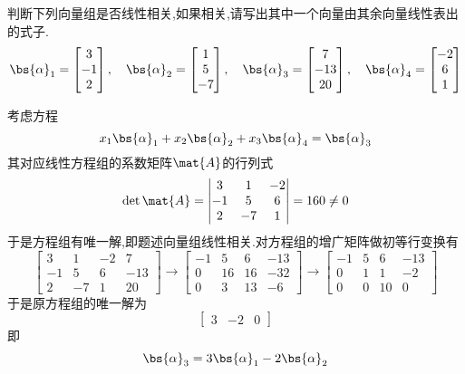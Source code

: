 \documentclass{ctexart}
\begin{document}
\begin{homework}[2(3)]
    判断下列向量组是否线性相关,如果相关,请写出其中一个向量由其余向量线性表出的式子.
    \[\bs{\alpha}_1=\begin{bmatrix}
        3\\-1\\2
    \end{bmatrix},\quad\bs{\alpha}_2=\begin{bmatrix}
        1\\5\\-7
    \end{bmatrix},\quad\bs{\alpha}_3=\begin{bmatrix}
        7\\-13\\20
    \end{bmatrix},\quad\bs{\alpha}_4=\begin{bmatrix}
        -2\\6\\1
    \end{bmatrix}\]
\end{homework}
\begin{solution}
    考虑方程
    \[x_1\bs{\alpha}_1+x_2\bs{\alpha}_2+x_3\bs{\alpha}_4=\bs{\alpha}_3\]
    其对应线性方程组的系数矩阵$\mat{A}$的行列式
    \[\det\mat{A}=\begin{vmatrix}
        3&1&-2\\
        -1&5&6\\
        2&-7&1
    \end{vmatrix}=160\neq0\]
    于是方程组有唯一解,即题述向量组线性相关.对方程组的增广矩阵做初等行变换有
    \[\begin{bmatrix}
        3&1&-2&7\\
        -1&5&6&-13\\
        2&-7&1&20
    \end{bmatrix}\longrightarrow
    \begin{bmatrix}
        -1&5&6&-13\\
        0&16&16&-32\\
        0&3&13&-6
    \end{bmatrix}\longrightarrow
    \begin{bmatrix}
        -1&5&6&-13\\
        0&1&1&-2\\
        0&0&10&0
    \end{bmatrix}\]
    于是原方程组的唯一解为
    \[\begin{bmatrix}
        3&-2&0
    \end{bmatrix}\]
    即
    \[\bs{\alpha}_3=3\bs{\alpha}_1-2\bs{\alpha}_2\]
\end{solution}
\end{document}

